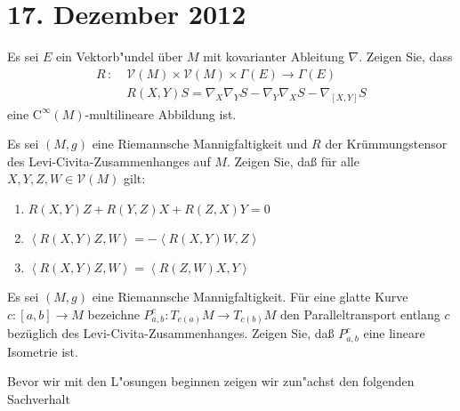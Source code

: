 
\section{17. Dezember 2012}
\setcounter{Aufg}{0} %
\setcounter{Loes}{0}

\begin{Aufg}
Es sei $E$ ein Vektorb"undel über $M$ mit kovarianter Ableitung $\nabla$.
Zeigen Sie, dass
\begin{align*}
	R \, : \; &\mathcal{V} (M) \times \mathcal{V} (M) \times \Gamma (E) \longrightarrow \Gamma (E) \\[1ex]
	& R(X,Y)S = \nabla_X \nabla_Y S - \nabla_Y \nabla_X S - \nabla_{[X,Y]} S
\end{align*}
eine $\mathrm{C}^{\infty} (M)$-multilineare Abbildung ist.
\end{Aufg}

\begin{Aufg}
Es sei $(M,g)$ eine Riemannsche Mannigfaltigkeit und $R$ der Krümmungstensor des Levi-Civita-Zusammenhanges auf $M$.
Zeigen Sie, daß für alle $X,Y,Z,W \in \mathcal{V} (M)$ gilt:
\begin{enumerate}[label=\alph*),leftmargin=*,widest=b]
\item
	$R(X,Y)Z + R(Y,Z)X + R(Z,X)Y = 0$
\item
	$\left\langle R(X,Y)Z,W \right\rangle = - \left\langle R(X,Y)W,Z \right\rangle$
\item
	$\left\langle R(X,Y)Z,W \right\rangle = \left\langle R(Z,W)X,Y \right\rangle$
\end{enumerate}\end{Aufg}

\begin{Aufg}
Es sei $(M,g)$ eine Riemannsche Mannigfaltigkeit.
Für eine glatte Kurve $c : [a,b] \rightarrow M$ bezeichne $P^c_{a,b} : T_{c(a)} M \rightarrow T_{c(b)} M$ den Paralleltransport entlang $c$ bezüglich des Levi-Civita-Zusammenhanges.
Zeigen Sie, daß $P^c_{a,b}$ eine lineare Isometrie ist.
\end{Aufg}

Bevor wir mit den L"osungen beginnen zeigen wir zun"achst den folgenden Sachverhalt

